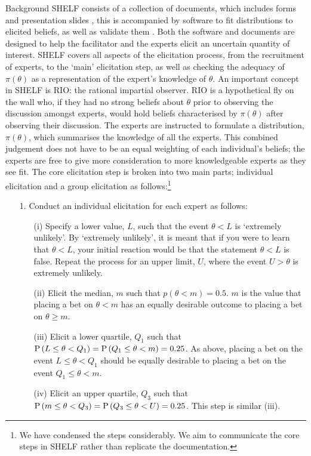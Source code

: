 \begin{chapter}{Background \label{Ch:background}}
SHELF consists of a collection of documents, which includes forms and presentation slides \citep{SHELF4}, this is accompanied by software to fit distributions to elicited beliefs, as well as validate them \citep{SHELFpkg}. Both the software and documents are designed to help the facilitator and the experts elicit an uncertain quantity of interest. SHELF covers all aspects of the elicitation process, from the recruitment of experts, to the `main' elicitation step, as well as checking the adequacy of $\pi(\theta)$ as a representation of the expert's knowledge of $\theta$. An important concept in SHELF is RIO: the rational impartial observer. RIO is a hypothetical fly on the wall who, if they had no strong beliefs about $\theta$ prior to observing the discussion amongst experts, would hold beliefs characterised by $\pi(\theta)$ after observing their discussion. The experts are instructed to formulate a distribution, $\pi(\theta)$, which summarises the knowledge of all the experts. This combined judgement does not have to be an equal weighting of each individual's beliefs; the experts are free to give more consideration to more knowledgeable experts as they see fit.
The core elicitation step is broken into two main parts; individual elicitation and a group elicitation as follows:\footnote{We have condensed the steps considerably. We aim to communicate the core steps in SHELF rather than replicate the documentation.}
\begin{itemize}
\item[1.] {Conduct an individual elicitation for each expert as follows:}
  \begin{itemize}
    \item[(i)] Specify a lower value, $L$, such that the event $\theta < L$ is `extremely unlikely'. By `extremely unlikely', it is meant that if you were to learn that $\theta < L$, your initial reaction would be that the statement $\theta < L$ is false. Repeat the process for an upper limit, $U$, where the event $U>\theta$ is extremely unlikely.
    \item[(ii)] Elicit the median, $m$ such that $p(\theta < m) = 0.5$. $m$ is the value that placing a bet on $\theta < m$ has an equally desirable outcome to placing a bet on $\theta \geq m$.
    \item[(iii)] Elicit a lower quartile, $Q_1$ such that $\mathrm{P}\,(L \leq \theta < Q_1) = \mathrm{P}\,(Q_1 \leq \theta < m) = 0.25$. As above, placing a bet on the event $L \leq \theta < Q_1$ should be equally desirable to placing a bet on the event $Q_1 \leq \theta < m$.
    \item[(iv)] Elicit an upper quartile, $Q_3$ such that $\mathrm{P}\,(m \leq \theta < Q_3) = \mathrm{P}\,(Q_3 \leq \theta < U) = 0.25$. This step is similar (iii).

\end{itemize}
\end{itemize}
\end{chapter}
